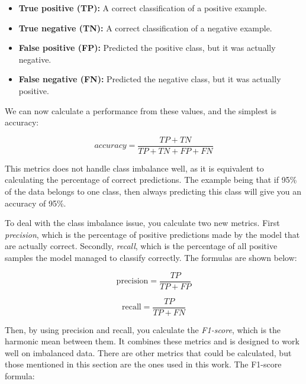         \begin{itemize}
            \item \textbf{True positive (TP):} A correct classification of a positive example.
            \item \textbf{True negative (TN):} A correct classification of a negative example.
            \item \textbf{False positive (FP):} Predicted the positive class, but it was actually negative.
            \item \textbf{False negative (FN):} Predicted the negative class, but it was actually positive.
            \end{itemize}
        
        We can now calculate a performance from these values, and the simplest is accuracy\cite{powers2020evaluation_f1_recall_precision}:
        
        \begin{equation}
            accuracy = \dfrac{TP+TN}{TP+TN+FP+FN} 
        \end{equation}
        
        This metrics does not handle class imbalance well\cite{powers2020evaluation_f1_recall_precision}, as it is equivalent to calculating the percentage of correct predictions. The example being that if 95\% of the data belongs to one class, then always predicting this class will give you an accuracy of 95\%.
        
        To deal with the class imbalance issue, you calculate two new metrics\cite{powers2020evaluation_f1_recall_precision}. First \textit{precision}, which is the percentage of positive predictions made by the model that are actually correct. Secondly, \textit{recall}, which is the percentage of all positive samples the model managed to classify correctly. The formulas are shown below:
        
        \begin{equation}
            \textrm{precision} = \dfrac{TP}{TP+FP}
        \end{equation}
        
        \begin{equation}
            \textrm{recall} = \dfrac{TP}{TP+FN}
        \end{equation}
        
        Then, by using precision and recall, you calculate the \textit{F1-score}, which is the harmonic mean between them\cite{powers2020evaluation_f1_recall_precision}. It combines these metrics and is designed to work well on imbalanced data. There are other metrics that could be calculated, but those mentioned in this section are the ones used in this work. The F1-score formula:
        
